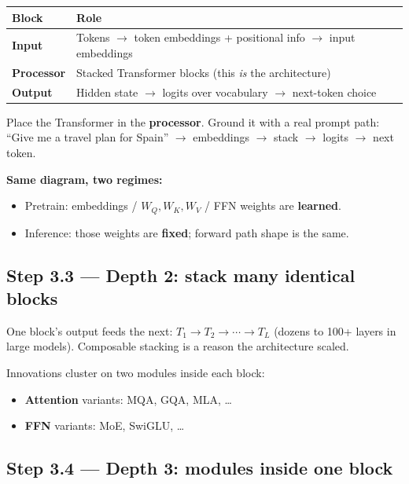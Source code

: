\documentclass[11pt,a4paper]{article}
\begin{document}
\begin{table}[ht]
\centering\small
\begin{tabularx}{\textwidth}{@{}YY@{}}
\toprule
\textbf{Block} & \textbf{Role} \\
\midrule
\textbf{Input} & Tokens $\rightarrow$ token embeddings + positional info $\rightarrow$ input embeddings \\
\textbf{Processor} & Stacked Transformer blocks (this \textit{is} the architecture) \\
\textbf{Output} & Hidden state $\rightarrow$ logits over vocabulary $\rightarrow$ next-token choice \\
\bottomrule
\end{tabularx}
\end{table}


Place the Transformer in the \textbf{processor}. Ground it with a real prompt path: ``Give me a travel plan for Spain'' $\rightarrow$ embeddings $\rightarrow$ stack $\rightarrow$ logits $\rightarrow$ next token.


\textbf{Same diagram, two regimes:}

\begin{itemize}
\item Pretrain: embeddings / \(W_Q,W_K,W_V\) / FFN weights are \textbf{learned}.  
\item Inference: those weights are \textbf{fixed}; forward path shape is the same.
\end{itemize}


\subsection{Step 3.3 --- Depth 2: stack many identical blocks}


One block's output feeds the next: \(T_1 \to T_2 \to \cdots \to T_L\) (dozens to 100+ layers in large models). Composable stacking is a reason the architecture scaled.


Innovations cluster on two modules inside each block:

\begin{itemize}
\item \textbf{Attention} variants: MQA, GQA, MLA, \ldots{}  
\item \textbf{FFN} variants: MoE, SwiGLU, \ldots{}
\end{itemize}


\subsection{Step 3.4 --- Depth 3: modules inside one block}
\end{document}
